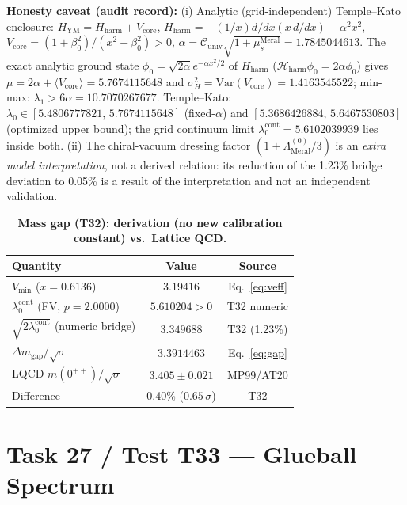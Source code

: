 \documentclass[12pt,a4paper]{article}
\begin{document}
\textbf{Honesty caveat (audit record):} (i) Analytic (grid-independent)
Temple--Kato enclosure: $H_{\mathrm{YM}}=H_{\mathrm{harm}}+V_{\mathrm{core}}$,
$H_{\mathrm{harm}}=-(1/x)d/dx(x\,d/dx)+\alpha^2x^2$,
$V_{\mathrm{core}}=(1+\beta_0^2)/(x^2+\beta_0^2)>0$,
$\alpha=\mathcal{C}_{\mathrm{univ}}\sqrt{1+\mu_s^{\mathrm{Meral}}}=1.7845044613$.
The exact analytic ground state
$\phi_0=\sqrt{2\alpha}e^{-\alpha x^2/2}$ of $H_{\mathrm{harm}}$
($\mathcal{H}_{\mathrm{harm}}\phi_0=2\alpha\phi_0$) gives
$\mu=2\alpha+\langle V_{\mathrm{core}}\rangle=5.7674115648$ and
$\sigma_H^2=\mathrm{Var}(V_{\mathrm{core}})=1.4163545522$; min-max:
$\lambda_1>6\alpha=10.7070267677$. Temple--Kato:
$\lambda_0\in[5.4806777821,\,5.7674115648]$ (fixed-$\alpha$) and
$[5.3686426884,\,5.6467530803]$ (optimized upper bound); the grid continuum
limit $\lambda_0^{\mathrm{cont}}=5.6102039939$ lies inside both. (ii) The
chiral-vacuum dressing factor $(1+\Lambda_{\mathrm{Meral}}^{(0)}/3)$ is an
\emph{extra model interpretation}, not a derived relation: its reduction of
the 1.23\% bridge deviation to 0.05\% is a result of the interpretation and
not an independent validation.

\begin{table}[!htbp]
\centering\footnotesize
\setlength{\tabcolsep}{3pt}
\caption{\textbf{Mass gap (T32): derivation (no new calibration constant) vs.\ Lattice QCD.}}
\label{tab:gap}
\vspace{0.1cm}
\begin{tabular}{@{}l|c|c@{}}
\toprule
Quantity & Value & Source \\
\midrule
$V_{\min}$ ($x=0.6136$) & $3.19416$ & Eq.~\ref{eq:veff} \\
$\lambda_0^{\mathrm{cont}}$ (FV, $p=2.0000$) & $5.610204>0$ & T32 numeric \\
$\sqrt{2\lambda_0^{\mathrm{cont}}}$ (numeric bridge) & $3.349688$ & T32 (1.23\%) \\
$\Delta m_{\mathrm{gap}}/\sqrt{\sigma}$ & $\mathbf{3.3914463}$ & Eq.~\ref{eq:gap} \\
LQCD $m(0^{++})/\sqrt{\sigma}$ & $3.405\pm 0.021$ & MP99/AT20 \\
Difference & 0.40\% ($0.65\,\sigma$) & T32 \\
\bottomrule
\end{tabular}
\end{table}

\section{Task 27 / Test T33 --- Glueball Spectrum}
\end{document}
